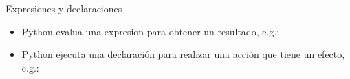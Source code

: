 \documentclass[
10pt,
aspectratio=169,
]{beamer}
\begin{document}
\begin{frame}[c]{Expresiones y declaraciones}
\begin{itemize}
\item Python evalua una \alert{expresion} para obtener un resultado, e.g.:
\begin{minipage}[t]{\linewidth}
\end{minipage}

\item Python ejecuta una \alert{declaraci\'on} para realizar una acci\'on que tiene un efecto, e.g.:
\begin{minipage}[t]{\linewidth}
\end{minipage}
\end{itemize}
\end{frame}
\end{document}
